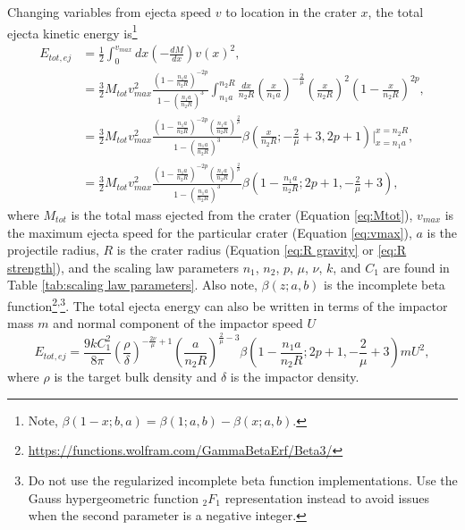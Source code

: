 \documentclass{article}
\begin{document}
Changing variables from ejecta speed $v$ to location in the crater $x$, the total ejecta kinetic energy is\footnote{Note, $\beta(1-x; b, a) = \beta(1; a, b) - \beta(x; a, b)$.}
\begin{align}
E_{tot,ej} &= \frac{1}{2}\int_{0}^{v_{max}}dx \left(-\frac{dM}{dx}\right)v(x)^2,\\\nonumber
&= \frac{3}{2}M_{tot}v_{max}^2\frac{\left(1-\frac{n_1 a}{n_2 R}\right)^{-2p}}{1-\left(\frac{n_1 a}{n_2 R}\right)^3}
\int_{n_1 a}^{n_2 R}
\frac{dx}{n_2 R}\left(\frac{x}{n_1 a}\right)^{-\frac{2}{\mu}}\left(\frac{x}{n_2 R}\right)^2\left(1-\frac{x}{n_2 R}\right)^{2p},\\\nonumber
& = \frac{3}{2}M_{tot}v_{max}^2\frac{\left(1-\frac{n_1 a}{n_2 R}\right)^{-2p}\left(\frac{n_1 a}{n_2 R}\right)^{\frac{2}{\mu}}}{1-\left(\frac{n_1 a}{n_2 R}\right)^3}
\beta\left(\frac{x}{n_2 R}; -\frac{2}{\mu}+3, 2p+1\right)\bigg\rvert^{x=n_2 R}_{x=n_1 a},\\
&=\frac{3}{2}M_{tot}v_{max}^2\frac{\left(1-\frac{n_1 a}{n_2 R}\right)^{-2p}\left(\frac{n_1 a}{n_2 R}\right)^{\frac{2}{\mu}}}{1-\left(\frac{n_1 a}{n_2 R}\right)^3}
\beta\left(1-\frac{n_1 a}{n_2 R}; 2p+1, -\frac{2}{\mu}+3\right),
\end{align}
where $M_{tot}$ is the total mass ejected from the crater (Equation \eqref{eq:Mtot}), $v_{max}$ is the maximum ejecta speed for the particular crater (Equation \eqref{eq:vmax}), $a$ is the projectile radius, $R$ is the crater radius (Equation \eqref{eq:R gravity} or \eqref{eq:R strength}), and the scaling law parameters $n_1$, $n_2$, $p$, $\mu$, $\nu$, $k$, and $C_1$ are found in Table \ref{tab:scaling law parameters}. Also note, $\beta(z; a, b)$ is the incomplete beta function\footnote{\href{https://functions.wolfram.com/GammaBetaErf/Beta3/}{https://functions.wolfram.com/GammaBetaErf/Beta3/}}\textsuperscript{,}\footnote{Do not use the regularized incomplete beta function implementations. Use the Gauss hypergeometric function $_2F_1$ representation instead to avoid issues when the second parameter is a negative integer.}.
The total ejecta energy can also be written in terms of the impactor mass $m$ and normal component of the impactor speed $U$ 
\begin{equation}\label{eq:Etotej}
E_{tot,ej} = \frac{9kC_1^2}{8\pi}\left(\frac{\rho}{\delta}\right)^{-\frac{2\nu}{\mu}+1}\left(\frac{a}{n_2 R}\right)^{\frac{2}{\mu}-3}
\beta\left(1-\frac{n_1 a}{n_2 R}; 2p+1, -\frac{2}{\mu}+3\right)
mU^2,
\end{equation}
where $\rho$ is the target bulk density and $\delta$ is the impactor density.
\end{document}
